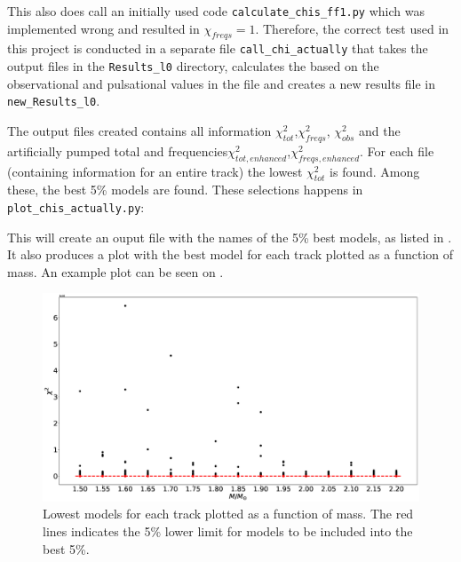 This also does call an initially used \chis code \texttt{calculate\_chis\_ff1.py} which was implemented wrong and resulted in $\chi_{freqs}=1$. Therefore, the correct \chis test used in this project is conducted in a separate file \texttt{call\_chi\_actually} that takes the output files in the \texttt{Results\_l0} directory, calculates the \chis based on the observational and pulsational values in the file and creates a new results file in \texttt{new\_Results\_l0}. 



The output files created contains all \chis information $\chi_{tot}^2$,$\chi_{freqs}^2$, $\chi_{obs}^2$ and the artificially pumped total \chis and frequencies$\chi_{tot, enhanced}^2$,$\chi_{freqs,enhanced}^2$. For each file (containing information for an entire track) the lowest $\chi_{ tot}^2$ is found. Among these, the best 5\% models are found. These selections happens in \texttt{plot\_chis\_actually.py}:



This will create an ouput file with the names of the 5\% best models, as listed in . It also produces a plot with the best \chis model for each track plotted as a function of mass. An example plot can be seen on . 

\begin{figure}[htbp]
	\centering
	\includegraphics[width=1\textwidth]{appendix_stuff/plotchis.eps}
	\caption{Lowest \chis models for each track plotted as a function of mass. The red lines indicates the 5\% lower \chis limit for models to be included into the best 5\%.   }
	\label{selectfive}
\end{figure}

